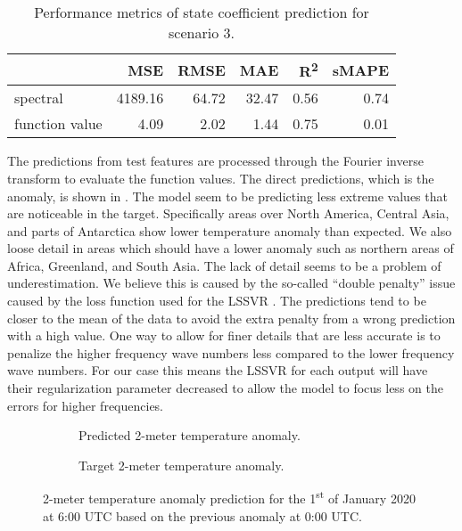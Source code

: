 \begin{table}[H]
  \caption{Performance metrics of state coefficient prediction for scenario 3.}\label{table:sc3_test_state_metrics}
  \centering
  \begin{tabular}{lrrrrr}
    \toprule
                   & MSE     & RMSE  & MAE   & R\textsuperscript{2} & sMAPE \\
    \midrule
    spectral       & 4189.16 & 64.72 & 32.47 & 0.56                 & 0.74  \\
    function value & 4.09    & 2.02  & 1.44  & 0.75                 & 0.01  \\
    \bottomrule
  \end{tabular}
\end{table}

The predictions from test features are processed through the Fourier inverse transform to evaluate the function values. The direct predictions, which is the anomaly, is shown in . The model seem to be predicting less extreme values that are noticeable in the target. Specifically areas over North America, Central Asia, and parts of Antarctica show lower temperature anomaly than expected. We also loose detail in areas which should have a lower anomaly such as northern areas of Africa, Greenland, and South Asia. The lack of detail seems to be a problem of underestimation. We believe this is caused by the so-called \enquote{double penalty} issue caused by the loss function used for the LSSVR \autocite{lledoScaledependentVerificationPrecipitation2023}. The predictions tend to be closer to the mean of the data to avoid the extra penalty from a wrong prediction with a high value. One way to allow for finer details that are less accurate is to penalize the higher frequency wave numbers less compared to the lower frequency wave numbers. For our case this means the LSSVR for each output will have their regularization parameter decreased to allow the model to focus less on the errors for higher frequencies.
\begin{figure}[H]
  \centering
  \begin{subfigure}{\linewidth}
    \begin{adjustbox}{width=\linewidth}
      
    \end{adjustbox}
    \caption{Predicted 2-meter temperature anomaly.}\label{fig:sc3_anomaly_pred}
  \end{subfigure}
  \begin{subfigure}{\linewidth}
    \begin{adjustbox}{width=\linewidth}
      
    \end{adjustbox}
    \caption{Target 2-meter temperature anomaly.}\label{fig:sc3_anomaly_target}
  \end{subfigure}
  \caption{2-meter temperature anomaly prediction for the 1\textsuperscript{st} of January 2020 at 6:00 UTC based on the previous anomaly at 0:00 UTC.}\label{fig:sc3_anomaly_predictions}
\end{figure}

